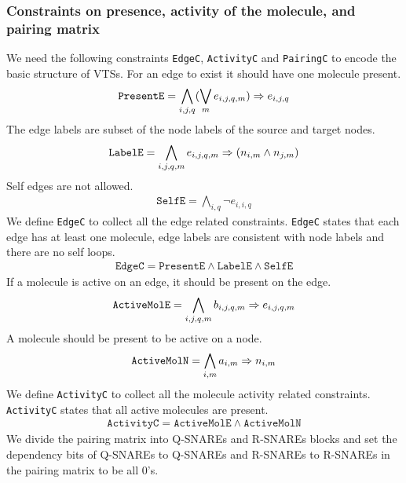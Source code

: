 \subsubsection{Constraints on presence, activity of the molecule, and pairing matrix}
%
We need the following constraints \texttt{EdgeC},
\texttt{ActivityC} and \texttt{PairingC} to encode the basic structure of VTSs.
%
For an edge to exist it should have one molecule present. 
%
\begin{align*}
  \texttt{PresentE} = \bigwedge\limits_{i,j,q} (\bigvee_m e_{i,j,q,m} )\Rightarrow e_{i,j,q}
\end{align*}
The edge labels are subset of the node labels of the source and target nodes.
\begin{align*}
  \texttt{LabelE} = \bigwedge\limits_{i,j,q,m} e_{i,j,q,m} \Rightarrow (n_{i,m} \land n_{j,m} )
\end{align*}
Self edges are not allowed. 
\begin{align*}
  \texttt{SelfE} = \bigwedge\limits_{i,q} \neg e_{i,i,q}
\end{align*}
\noindent We define \texttt{EdgeC} to collect all the edge related constraints. 
%
\texttt{EdgeC} states that each edge has at least one molecule,
 edge labels are consistent with node labels and there are no self loops.    
\begin{align*}
  \texttt{EdgeC} = \texttt{PresentE} \land \texttt{LabelE}  \land \texttt{SelfE} 
\end{align*}
\noindent If a molecule is active on an edge, it should be present on the edge.
%
\begin{align*}
  \texttt{ActiveMolE} = \bigwedge\limits_{i,j,q,m} b_{i,j,q,m} \Rightarrow e_{i,j,q,m}\label{eq:f1}
\end{align*}
A molecule should be present to be active on a node.  
\begin{align*}
    \texttt{ActiveMolN} = \bigwedge\limits_{i,m} a_{i,m} \Rightarrow n_{i,m}
\end{align*}
\noindent We define \texttt{ActivityC} to collect all the molecule activity related constraints. 
\texttt{ActivityC} states that all active molecules are present.
\begin{align*}
  \texttt{ActivityC} = \texttt{ActiveMolE} \land \texttt{ActiveMolN} 
\end{align*}
\noindent We divide the pairing matrix into Q-SNAREs and R-SNAREs blocks and set the dependency bits of Q-SNAREs to Q-SNAREs and R-SNAREs to R-SNAREs in the pairing matrix to be all 0's.

